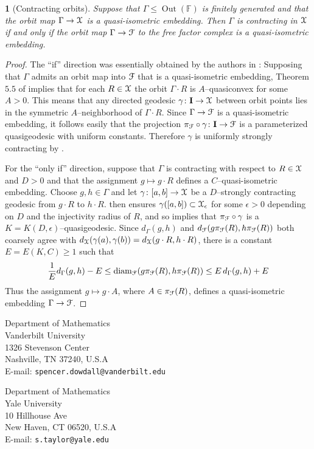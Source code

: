 \documentclass[letterpaper,fleqn]{article}
\theoremstyle{plain}
\newtheorem*{thm:orbits}{\Cref{th:contracting_orbit}}
\theoremstyle{definition}
\DeclareMathOperator{\diam}{diam}
\DeclareMathOperator{\Out}{Out}
\newcommand{\free}{\mathbb{F}} %
\newcommand{\factor}{{\EuScript F}} %
\newcommand{\F}{\factor} %
\newcommand{\fc}{\factor} %
\newcommand{\os}{{\EuScript X}} %
\newcommand{\X}{\os}
\newcommand{\fproj}{\pi_\fc} %
\renewcommand{\diam}{\mathrm{diam}}
\newcommand{\I}{\mathbf{I}}
\begin{document}
\begin{thm:orbits}[Contracting orbits]
Suppose that $\Gamma \le \Out(\free)$ is finitely generated and that the orbit map $\Gamma \to \X$ is a quasi-isometric embedding. Then $\Gamma$ is contracting in $\os$ if and only if the orbit map $\Gamma\to\fc$ to the free factor complex is a quasi-isometric embedding.
\end{thm:orbits}
\begin{proof}
The ``if'' direction was essentially obtained by the authors in \cite{DT1}:  Supposing that $\Gamma$ admits an orbit map into $\F$ that is a quasi-isometric embedding, Theorem $5.5$ of \cite{DT1} implies that for each $R\in \os$ the orbit $\Gamma \cdot R$ is $A$--quasiconvex for some $A>0$. This means that any directed geodesic $\gamma\colon\I\to\os$ between orbit points lies in the symmetric $A$--neighborhood of $\Gamma\cdot R$. Since $\Gamma\to\fc$ is a quasi-isometric embedding, it follows easily that the projection $\fproj\circ\gamma\colon\I\to\fc$ is a parameterized quasigeodesic with uniform constants. Therefore $\gamma$ is uniformly strongly contracting by .

For the ``only if'' direction, suppose that $\Gamma$ is contracting with respect to $R\in \os$ and $D > 0$ and that the assignment $g\mapsto g\cdot R$ defines a $C$--quasi-isometric embedding. Choose $g,h\in \Gamma$ and let $\gamma\colon[a,b]\to \os$ be a $D$--strongly contracting geodesic from $g\cdot R$ to $h\cdot R$.  then ensures $\gamma([a,b])\subset \os_\epsilon$ for some $\epsilon>0$ depending on $D$ and the injectivity radius of $R$, and so  implies that $\fproj\circ\gamma$ is a $K=K(D,\epsilon)$--quasigeodesic. Since $d_\Gamma(g,h)$ and $d_\fc(g\fproj(R),h\fproj(R))$ both coarsely agree with $d_\os(\gamma(a),\gamma(b)) = d_\os(g\cdot R,h\cdot R)$, there is a constant $E = E(K,C)\ge 1$ such that
\[\frac{1}{E} d_\Gamma(g,h) - E \le \diam_\fc(g\fproj(R),h\fproj(R)) \le E\,d_\Gamma(g,h) + E\]
Thus the assignment $g\mapsto g\cdot A$, where $A\in\fproj(R)$, defines a quasi-isometric embedding $\Gamma\to \fc$.
\end{proof} 





\bigskip

\noindent
\begin{minipage}{.55\linewidth}
Department of Mathematics\\
Vanderbilt University\\
1326 Stevenson Center\\
Nashville, TN 37240, U.S.A\\
E-mail: {\tt spencer.dowdall@vanderbilt.edu}
\end{minipage}
\begin{minipage}{.45\linewidth}
Department of Mathematics\\ 
Yale University\\ 
10 Hillhouse Ave\\ 
New Haven, CT 06520, U.S.A\\
E-mail: {\tt s.taylor@yale.edu}
\end{minipage}
\end{document}
